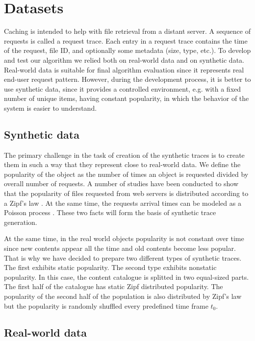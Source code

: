 \section{Datasets} \label{datasets}

Caching is intended to help with file retrieval from a distant server. A sequence of requests is called a request trace. Each entry in a request trace contains the time of the request, file ID, and optionally some metadata (size, type, etc.). To develop and test our algorithm we relied both on real-world data and on synthetic data. Real-world data is suitable for final algorithm evaluation since it represents real end-user request pattern. However, during the development process, it is better to use synthetic data, since it provides a controlled environment, e.g. with a fixed number of unique items, having constant popularity, in which the behavior of the system is easier to understand.

\subsection{Synthetic data} \label{synthetic_data}

The primary challenge in the task of creation of the synthetic traces is to create them in such a way that they represent close to real-world data. We define the popularity of the object as the number of times an  object is requested divided by overall number of requests. A number of studies have been conducted to show that the popularity of files requested from web servers is distributed according to a Zipf's law \cite{10}. At the same time, the requests arrival times can be modeled as a Poisson process \cite{11}. These two facts will form the basis of synthetic trace generation.

At the same time, in the real world objects popularity is not constant over time since new contents appear all the time and old contents become less popular. That is why we have decided to prepare two different types of synthetic traces. The first exhibits static popularity. The second type exhibits nonstatic popularity. In this case, the content catalogue is splitted in two equal-sized parts. The first half of the catalogue has static Zipf distributed popularity. The popularity of the second half of the population is also distributed by Zipf's law but the popularity is randomly shuffled every predefined time frame $ t_0 $.

\subsection{Real-world data} \label{real_data}

